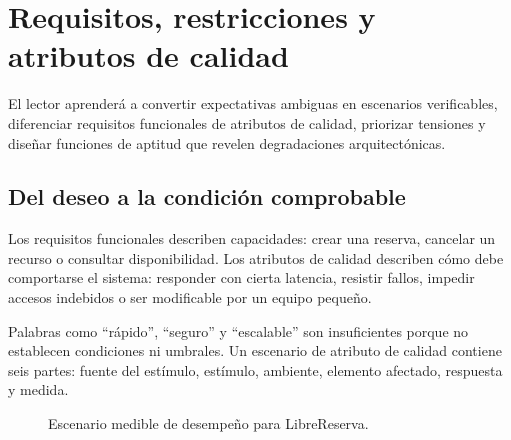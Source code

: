 \chapter{Requisitos, restricciones y atributos de calidad}

\begin{objetivos}
El lector aprenderá a convertir expectativas ambiguas en escenarios verificables, diferenciar requisitos funcionales de atributos de calidad, priorizar tensiones y diseñar funciones de aptitud que revelen degradaciones arquitectónicas.
\end{objetivos}

\section{Del deseo a la condición comprobable}
Los requisitos funcionales describen capacidades: crear una reserva, cancelar un recurso o consultar disponibilidad. Los atributos de calidad describen cómo debe comportarse el sistema: responder con cierta latencia, resistir fallos, impedir accesos indebidos o ser modificable por un equipo pequeño.

Palabras como ``rápido'', ``seguro'' y ``escalable'' son insuficientes porque no establecen condiciones ni umbrales. Un escenario de atributo de calidad contiene seis partes: fuente del estímulo, estímulo, ambiente, elemento afectado, respuesta y medida.

\begin{figure}[H]
\centering
{}
\caption{Escenario medible de desempeño para LibreReserva.}
\label{fig:escenario-calidad}
\end{figure}

